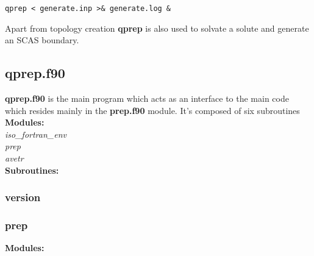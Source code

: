 \documentclass[10pt, oneside, pdftex]{article}
\begin{document}
\lstset{language=sh, frame=single}
\begin{Verbatim}
qprep < generate.inp >& generate.log &
\end{Verbatim}

Apart from topology creation \textbf{qprep} is also used to solvate a
solute and generate an SCAS boundary.



\subsection{qprep.f90}

\textbf{qprep.f90} is the  main program which acts as  an interface to
the main  code which resides  mainly in the  \textbf{prep.f90} module.
It's composed of six subroutines\\



\textbf{Modules: }\\
\textit{iso\_fortran\_env}\\
\textit{prep}\\
\textit{avetr}\\


\textbf{Subroutines: }\\


\subsubsection{version} 
\subsubsection{prep}
\textbf{Modules: }\\
\textit{}

\end{document}
